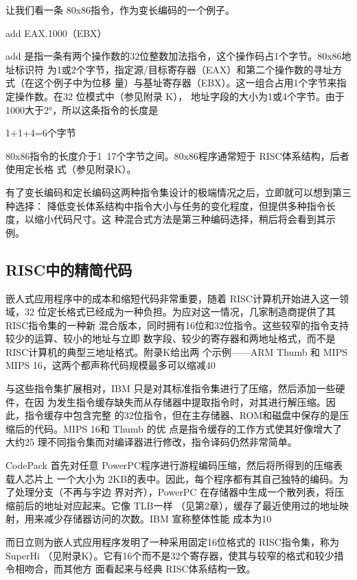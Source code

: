 让我们看一条 80x86指令，作为变长编码的一个例子。

add EAX.1000（EBX）

add 是指一条有两个操作数的32位整数加法指令，这个操作码占1个字节。80x86地址标识符
为1或2个字节，指定源/目标寄存器（EAX）和第二个操作数的寻址方式（在这个例子中为位移
量）与基址寄存器（EBX）。这一组合占用1个字节来指定操作数。在32 位模式中（参见附录 K），
地址字段的大小为1或4个字节。由于1000大于2°，所以这条指令的长度是

1+1+4=6个字节

80x86指令的长度介于1~17个字节之间。80x86程序通常短于 RISC体系结构，后者使用定长格
式（参见附录K）。

有了变长编码和定长编码这两种指令集设计的极端情况之后，立即就可以想到第三种选择：
降低变长体系结构中指令大小与任务的变化程度，但提供多种指令长度，以缩小代码尺寸。这
种混合式方法是第三种编码选择，稍后将会看到其示例。

\subsection{RISC中的精简代码}
嵌人式应用程序中的成本和缩短代码非常重要，随着 RISC计算机开始进入这一领域，32
位定长格式已经成为一种负担。为应对这一情况，几家制造商提供了其 RISC指令集的一种新
混合版本，同时拥有16位和32位指令。这些较窄的指令支持较少的运算、较小的地址与立即
数字段、较少的寄存器和两地址格式，而不是 RISC计算机的典型三地址格式。附录K给出两
个示例——ARM Thumb 和 MIPS MIPS 16，这两个都声称代码规模最多可以缩减40%

与这些指令集扩展相对，IBM 只是对其标准指令集进行了压缩，然后添加一些硬件，在因
为发生指令缓存缺失而从存储器中提取指令时，对其进行解压缩。因此，指令缓存中包含完整
的32位指令，但在主存储器、ROM和磁盘中保存的是压缩后的代码。MIPS 16和 Thumb 的优
点是指令缓存的工作方式使其好像增大了大约25%
理不同指令集而对编译器进行修改，指令译码仍然非常简单。

CodePack 首先对任意 PowerPC程序进行游程编码压缩，然后将所得到的压缩表载人芯片上
一个大小为 2KB的表中。因此，每个程序都有其自己独特的编码。为了处理分支（不再与宇边
界对齐），PowerPC 在存储器中生成一个散列表，将压缩前后的地址对应起来。它像 TLB一样
（见第2章），缓存了最近使用过的地址映射，用来减少存储器访问的次数。IBM 宣称整体性能
成本为10%

而日立则为嵌人式应用程序发明了一种采用固定16位格式的 RISC指令集，称为 SuperHi
（见附录K）。它有16个而不是32个寄存器，使其与较窄的格式和较少措令相吻合，而其他方
面看起来与经典 RISC体系结构一致。

